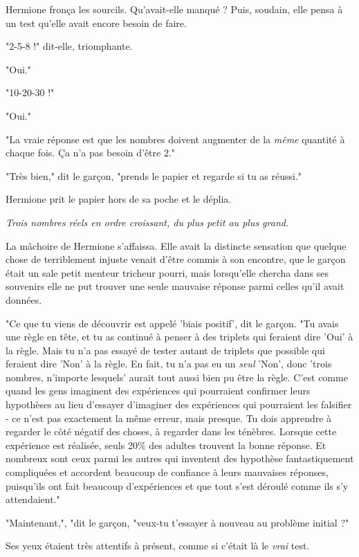 Hermione fronça les sourcils. Qu'avait-elle manqué ? Puis, soudain, elle pensa à un test qu'elle avait encore besoin de faire.

"2-5-8 !" dit-elle, triomphante.

"Oui."

"10-20-30 !"

"Oui."

"La vraie réponse est que les nombres doivent augmenter de la \emph{même}  quantité à chaque fois. Ça n'a pas besoin d'être 2."

"Très bien," dit le garçon, "prends le papier et regarde si tu as réussi."

Hermione prit le papier hors de sa poche et le déplia.

\emph{Trois nombres réels en ordre croissant, du plus petit au plus grand.} 

La mâchoire de Hermione s'affaissa. Elle avait la distincte sensation que quelque chose de terriblement injuste venait d'être commis à son encontre, que le garçon était un sale petit menteur tricheur pourri, mais lorsqu'elle chercha dans ses souvenirs elle ne put trouver une seule mauvaise réponse parmi celles qu'il avait données.

"Ce que tu viens de découvrir est appelé 'biais positif', dit le garçon. "Tu avais une règle en tête, et tu as continué à penser à des triplets qui feraient dire 'Oui' à la règle. Mais tu n'a pas essayé de tester autant de triplets que possible qui feraient dire 'Non' à la règle. En fait, tu n'a pas eu un \emph{seul}  'Non', donc 'trois nombres, n'importe lesquels' aurait tout aussi bien pu être la règle. C'est comme quand les gens imaginent des expériences qui pourraient confirmer leurs hypothèses au lieu d'essayer d'imaginer des expériences qui pourraient les falsifier - ce n'est pas exactement la même erreur, mais presque. Tu dois apprendre à regarder le côté négatif des choses, à regarder dans les ténèbres. Lorsque cette expérience est réalisée, seuls 20\% des adultes trouvent la bonne réponse. Et nombreux sont ceux parmi les autres qui inventent des hypothèse fantastiquement compliquées et accordent beaucoup de confiance à leurs mauvaises réponses, puisqu'ils ont fait beaucoup d'expériences et que tout s'est déroulé comme ils s'y attendaient."

"Maintenant,", "dit le garçon, "veux-tu t'essayer à nouveau au problème initial ?"

Ses yeux étaient très attentifs à présent, comme si c'était là le \emph{vrai}  test.

